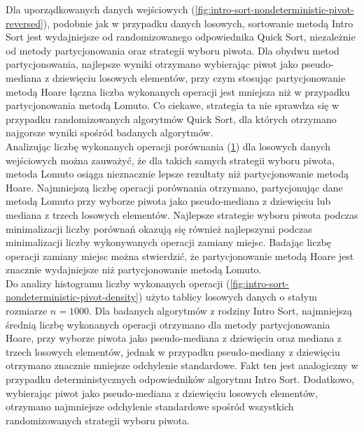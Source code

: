 Dla uporządkowanych danych wejściowych (\ref{fig:intro-sort-nondeterministic-pivot-reversed}), podobnie jak w przypadku danych losowych, sortowanie metodą Intro Sort jest wydajniejsze od randomizowanego odpowiednika Quick Sort, niezależnie od metody partycjonowania oraz strategii wyboru piwota. Dla obydwu metod partycjonowania, najlepsze wyniki otrzymano wybierając piwot jako pseudo-mediana z dziewięciu losowych elementów, przy czym stosując partycjonowanie metodą Hoare łączna liczba wykonanych operacji jest mniejsza niż w przypadku partycjonowania metodą Lomuto. Co ciekawe, strategia ta nie sprawdza się w przypadku randomizowanych algorytmów Quick Sort, dla których otrzymano najgorsze wyniki spośród badanych algorytmów.\\

Analizując liczbę wykonanych operacji porównania (\ref{fig:intro-sort-nondeterministic-pivot-random-all}) dla losowych danych wejściowych można zauważyć, że dla takich samych strategii wyboru piwota, metoda Lomuto osiąga nieznacznie lepsze rezultaty niż partycjonowanie metodą Hoare. Najmniejszą liczbę operacji porównania otrzymano, partycjonując dane metodą Lomuto przy wyborze piwota jako pseudo-mediana z dziewięciu lub mediana z trzech losowych elementów.
Najlepsze strategie wyboru piwota podczas minimalizacji liczby porównań okazują się również najlepszymi podczas minimalizacji liczby wykonywanych operacji zamiany miejsc. Badając liczbę operacji zamiany miejsc można stwierdzić, że partycjonowanie metodą Hoare jest znacznie wydajniejsze niż partycjonowanie metodą Lomuto.\\

Do analizy histogramu liczby wykonanych operacji (\ref{fig:intro-sort-nondeterministic-pivot-density}) użyto tablicy losowych danych o stałym rozmiarze $n = 1000$. Dla badanych algorytmów z rodziny Intro Sort, najmniejszą średnią liczbę wykonanych operacji otrzymano dla metody partycjonowania Hoare, przy wyborze piwota jako pseudo-mediana z dziewięciu oraz mediana z trzech losowych elementów, jednak w przypadku pseudo-mediany z dziewięciu otrzymano znacznie mniejsze odchylenie standardowe. Fakt ten jest analogiczny w przypadku deterministycznych odpowiedników algorytmu Intro Sort. Dodatkowo, wybierając piwot jako pseudo-mediana z dziewięciu losowych elementów, otrzymano najmniejsze odchylenie standardowe spośród wszystkich randomizowanych strategii wyboru piwota.\\

\begin{figure}[]
	\centering
	
	\caption[]{}
	\label{fig:intro-sort-nondeterministic-pivot-random-all}
\end{figure}

